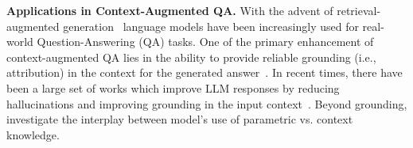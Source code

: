 \textbf{Applications in Context-Augmented QA.} With the advent of retrieval-augmented generation~\citep{lewis2021retrievalaugmentedgenerationknowledgeintensivenlp, gao2024retrievalaugmentedgenerationlargelanguage} language models have been increasingly used for real-world Question-Answering (QA) tasks. One of the primary enhancement of context-augmented QA lies in the ability to provide reliable grounding (i.e., attribution) in the context for the generated answer~\citep{li2023surveylargelanguagemodels, khalifa2024sourceawaretrainingenablesknowledge, huang2024citationkeybuildingresponsible, ye2024effectivelargelanguagemodel}. In recent times, there have been a large set of works which improve LLM responses by reducing hallucinations and improving grounding in the input context~\citep{ye2024effectivelargelanguagemodel, asai2023selfraglearningretrievegenerate, xu2024searchinthechaininteractivelyenhancinglarge, zhang2024knowledgealignmentproblembridging}.
Beyond grounding, \citep{wu2024clashevalquantifyingtugofwarllms, xu2024knowledgeconflictsllmssurvey, mallen2023trustlanguagemodelsinvestigating, wang2023causalviewentitybias} investigate the interplay between model's use of parametric vs. context knowledge.
\vspace{-0.4cm}